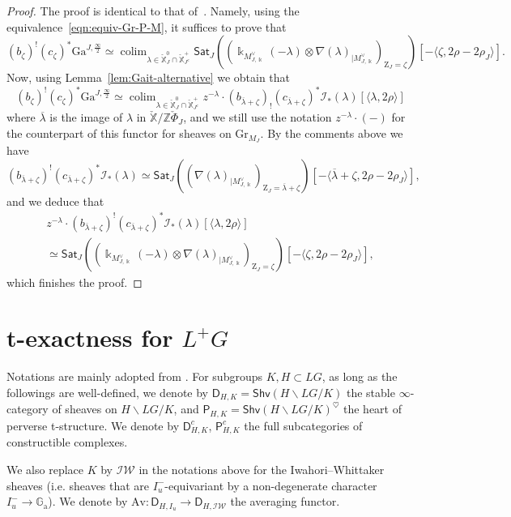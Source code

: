 \documentclass[11pt]{amsart}
\numberwithin{equation}{section}
\theoremstyle{plain}
\theoremstyle{definition}
\newcommand{\D}{{\mathsf D}}
\newcommand{\sI}{{\mathcal I}}
\renewcommand{\k}{\Bbbk}
\renewcommand{\P}{{\mathsf P}}
\newcommand{\X}{{\mathbb X}}
\newcommand{\Xd}{\check{\X}}
\newcommand{\Z}{{\mathbb Z}}
\newcommand{\Ga}{{\mathbb{G}_{\mathrm{a}}}}
\newcommand{\semi}{{{\frac{\infty}{2}}}}
\newcommand{\Av}{\mathrm{Av}}
\newcommand{\IW}{\mathcal{IW}}
\newcommand{\Gr}{\mathrm{Gr}}
\newcommand{\comp}{\mathrm{c}}
\newcommand{\Gait}{\mathrm{Ga}}
\newcommand{\Sat}{\mathsf{Sat}}
\DeclareMathOperator*{\colim}{colim}
\begin{document}
\begin{proof}
The proof is identical to that of~\cite[Proposition~4.1.12]{DL23}. Namely, using the equivalence~\eqref{eqn:equiv-Gr-P-M}, it suffices to prove that
\[
(b_\zeta)^! (c_\zeta)^* \Gait^{J,\semi} \simeq \colim_{\lambda \in \Xd_J^0 \cap \Xd^+_{J^\comp}} \Sat_J \left( (\k_{M^\vee_{J,\k}}(-\lambda) \otimes \nabla(\lambda)_{| M^\vee_{J,\k}})_{\mathrm{Z}_J=\zeta} \right) [- \langle \zeta, 2\rho-2\rho_J \rangle].
\]
Now, using Lemma~\ref{lem:Gait-alternative} we obtain that
\[
(b_\zeta)^! (c_\zeta)^* \Gait^{J,\semi} \simeq \colim_{\lambda \in \Xd_J^0 \cap \Xd^+_{J^\comp}} z^{-\lambda} \cdot (b_{\overline{\lambda}+\zeta})_! (c_{\overline{\lambda}+\zeta})^* \sI_*(\lambda)[\langle \lambda,2\rho \rangle]
\]
where $\overline{\lambda}$ is the image of $\lambda$ in $\Xd / \Z {\check \Phi}_J$, and we still use the notation $z^{-\lambda} \cdot (-)$ for the counterpart of this functor for sheaves on $\Gr_{M_J}$. By the comments above we have
\[
(b_{\overline{\lambda}+\zeta})^! (c_{\overline{\lambda}+\zeta})^* \sI_*(\lambda) \simeq \Sat_J \left( (\nabla(\lambda)_{| M^\vee_{J,\k}})_{\mathrm{Z}_J=\overline{\lambda}+\zeta} \right) [-\langle \overline{\lambda}+\zeta, 2\rho-2\rho_J \rangle],
\]
and we deduce that
\begin{multline*}
z^{-\lambda} \cdot (b_{\overline{\lambda}+\zeta})^! (c_{\overline{\lambda}+\zeta})^* \sI_*(\lambda)[\langle \lambda,2\rho \rangle] \\
\simeq \Sat_J \left( (\k_{M^\vee_{J,\k}}(-\lambda) \otimes \nabla(\lambda)_{| M^\vee_{J,\k}})_{\mathrm{Z}_J=\zeta} \right) [- \langle \zeta, 2\rho-2\rho_J \rangle],
\end{multline*}
which finishes the proof.
\end{proof}

\iffalse
\section{t-exactness for $L^+G$} 
Notations are mainly adopted from \cite{adr}. 
For subgroups $K,H\subset LG$, as long as the followings are well-defined, we denote by $\D_{H,K}=\mathsf{Shv}(H\backslash LG/K)$ the stable $\infty$-category of sheaves on $H\backslash LG/K$, and $\P_{H,K}=\mathsf{Shv}(H\backslash LG/K)^\heartsuit$ the heart of perverse t-structure. 
We denote by $\D^c_{H,K}$, $\P^c_{H,K}$ the full subcategories of constructible complexes. 

We also replace $K$ by $\IW$ in the notations above for the Iwahori--Whittaker sheaves (i.e. sheaves that are $I_u^-$-equivariant by a non-degenerate character $I_u^-\rightarrow \Ga$). 
We denote by $\Av: \D_{H,I_u}\rightarrow \D_{H,\IW}$ the averaging functor. 
\end{document}
